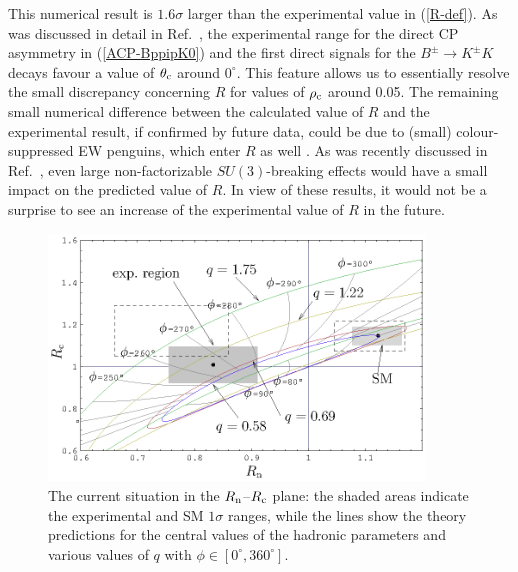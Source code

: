 \documentclass[11pt]{cernrep}
\begin{document}
This numerical result is $1.6 \sigma$ larger than the experimental value
in (\ref{R-def}). As was discussed in detail in Ref.~\cite{BFRS-up}, 
the experimental range for the direct CP asymmetry in (\ref{ACP-BppipK0})  
and the first direct signals for the $B^\pm\to K^\pm K$ decays favour a 
value of $\theta_{\rm c}$ around $0^\circ$. This feature allows us to essentially 
resolve the small discrepancy concerning $R$ for values of $\rho_{\rm c}$ around 
0.05. The remaining small numerical difference between the calculated value of
$R$ and the experimental result, if confirmed by future data, could be due to
(small) colour-suppressed EW penguins, which enter $R$ as well \cite{BFRS3}.
As was recently discussed in Ref.~\cite{BFRS-5}, even large non-factorizable
$SU(3)$-breaking effects would have a small impact on the predicted value 
of $R$. In view of these results, it would not be a surprise to see an increase 
of the experimental value of $R$ in the future. 


\begin{figure}
\begin{center}
\includegraphics[width=10cm]{RnRc0511.eps}
\end{center}
\vspace*{-0.5truecm}
\caption{The current situation in the $R_{\rm n}$--$R_{\rm c}$ plane: the shaded 
areas indicate the experimental and SM $1 \sigma$ ranges, while the lines show the
theory predictions for the central values of the hadronic parameters
and various values of $q$ with $\phi\in[0^\circ,360^\circ]$.}\label{fig:RnRc}
\end{figure}
\end{document}
